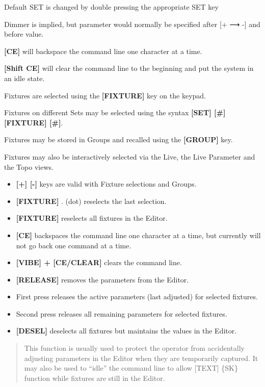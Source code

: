 \documentclass[
]{article}
\begin{document}
Default SET is changed by double pressing the appropriate SET key

Dimmer is implied, but parameter would normally be specified after {[}+ ⟶ -{]} and before value.

\textbf{{[}CE{]}} will backspace the command line one character at a time.

\textbf{{[}Shift CE{]}} will clear the command line to the beginning and put the system in an idle state.

Fixtures are selected using the \textbf{{[}FIXTURE{]}} key on the keypad.

Fixtures on different Sets may be selected using the syntax \textbf{{[}SET{]} {[}\#{]} {[}FIXTURE{]} {[}\#{]}}.

Fixtures may be stored in Groups and recalled using the \textbf{{[}GROUP{]}} key.

Fixtures may also be interactively selected via the Live, the Live Parameter and the Topo views.

\begin{itemize}
\item
  \textbf{{[}+{]} {[}-{]}} keys are valid with Fixture selections and Groups.
\item
  \textbf{{[}FIXTURE{]}} . (dot) reselects the last selection.
\item
  \textbf{{[}FIXTURE{]}} reselects all fixtures in the Editor.
\item
  \textbf{{[}CE{]}} backspaces the command line one character at a time, but currently will not go back one command at a time.
\item
  \textbf{{[}VIBE{]} + {[}CE/CLEAR{]}} clears the command line.
\item
  \textbf{{[}RELEASE{]}} removes the parameters from the Editor.
\item
  First press releases the active parameters (last adjusted) for selected fixtures.
\item
  Second press releases all remaining parameters for selected fixtures.
\item
  \textbf{{[}DESEL{]}} deselects all fixtures but maintains the values in the Editor.
\end{itemize}

\begin{quote}
This function is usually used to protect the operator from accidentally adjusting parameters in the Editor when they are temporarily captured. It may also be used to ``idle'' the command line to allow {[}TEXT{]} \{SK\} function while fixtures are still in the Editor.
\end{quote}
\end{document}
